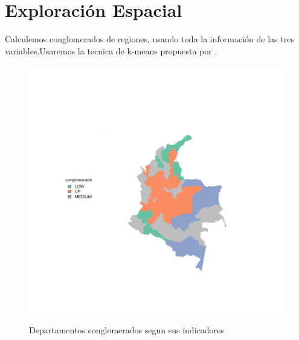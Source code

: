 \documentclass{article}
\begin{document}
\section{Exploración Espacial}

Calculemos conglomerados de regiones, usando toda la información de las tres variables.Usaremos la tecnica de k-means propuesta por \cite{macqueen_methods_nodate}.






\begin{figure}[h]
\centering
\begin{adjustbox}{width=11cm,height=8cm,clip,trim=1cm 2.5cm 0cm 2.5cm}
\includegraphics{paper_version1-plotMap1}
\end{adjustbox}
\caption{Departamentos conglomerados segun sus indicadores}\label{clustmap}
\end{figure}




\end{document}
